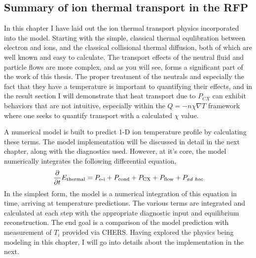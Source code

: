 \begin{refsection}
\section{Summary of ion thermal transport in the RFP}\label{sec:transport_summary}

In this chapter I have laid out the ion thermal transport physics incorporated into the model. Starting with the simple, classical thermal equlibration between electron and ions, and the classical collisional thermal diffusion, both of which are well known and easy to calculate. The transport effects of the neutral fluid and particle flows are more complex, and as you will see, forms a significant part of the work of this thesis. The proper treatment of the neutrals and especially the fact that they have a temperature is important to quantifying their effects, and in the result section I will demonstrate that heat transport due to $P_{CX}$ can exhibit behaviors that are not intuitive, especially within the $Q = -n\chi\nabla T$ framework where one seeks to quantify transport with a calculated $\chi$ value. 

A numerical model is built to predict 1-D ion temperature profile by calculating these terms. The model implementation will be discussed in detail in the next chapter, along with the diagnostics used. However, at it's core, the model numerically integrates the following differential equation,
\begin{align}
    \frac{\partial}{\partial t} E_\text{thermal} = P_\text{e-i} + P_\text{cond} + P_\text{CX} + P_\text{flow} + P_\textit{ad hoc}
\end{align}
In the simplest form, the model is a numerical integration of this equation in time, arriving at temperature predictions. The various terms are integrated and calculated at each step with the appropriate diagnostic input and equilibrium reconstruction. The end goal is a comparison of the model prediction with measurement of $T_i$ provided via CHERS. Having explored the physics being modeling in this chapter, I will go into details about the implementation in the next.  


\printbibliography%
\end{refsection}

